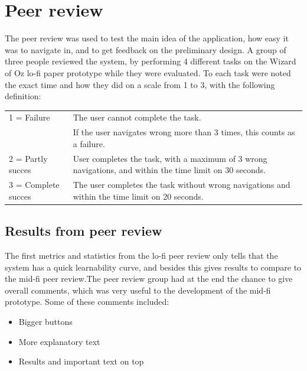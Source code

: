 \section{Peer review}
The peer review was used to test the main idea of the application, how easy it was to navigate in, and to get feedback on the preliminary design. A group of three people reviewed the system, by performing 4 different tasks on the Wizard of Oz lo-fi paper prototype while they were evaluated. To each task were noted the exact time and how they did on a scale from 1 to 3, with the following definition:
\begin{table}[H]
    \begin{tabular}{|p{4cm} p{10cm}|}
    \hline
    1 = Failure         & The user cannot complete the task. \\
    ~ & If the user navigates wrong more than 3 times, this counts as a failure. \\ \hline
    2 = Partly succes   & User completes the task, with a maximum of 3 wrong navigations, and within the time limit on 30 seconds.    \\ \hline
    3 = Complete succes & The user completes the task without wrong navigations and within the time limit on 20 seconds.              \\ \hline
    \end{tabular}
\end{table}

\subsection{Results from peer review}
The first metrics and statistics from the lo-fi peer review only tells that the system has a quick learnability curve, and besides this gives results to compare to the mid-fi peer review.The peer review group had at the end the chance to give overall comments, which was very useful to the development of the mid-fi prototype. 
Some of these comments included:\\
\begin{itemize}
\item Bigger buttons
\item More explanatory text
\item Results and important text on top
\end{itemize}

